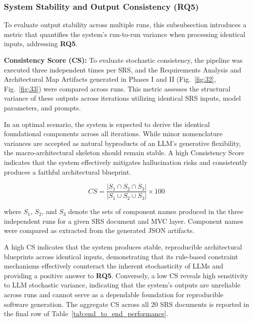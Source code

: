 \subsubsection{System Stability and Output Consistency (RQ5)}

To evaluate output stability across multiple runs, this subsubsection introduces a metric that quantifies the system's run-to-run variance when processing identical inputs, addressing \textbf{RQ5}.

\textbf{Consistency Score (CS):} To evaluate stochastic consistency, the pipeline was executed three independent times per SRS, and the Requirements Analysis and Architectural Map Artifacts generated in Phases I and II (Fig.~\ref{fig:32}, Fig.~\ref{fig:33}) were compared across runs. This metric assesses the structural variance of these outputs across iterations utilizing identical SRS inputs, model parameters, and prompts. 

In an optimal scenario, the system is expected to derive the identical foundational components across all iterations. While minor nomenclature variances are accepted as natural byproducts of an LLM's generative flexibility, the macro-architectural skeleton should remain stable. A high Consistency Score indicates that the system effectively mitigates hallucination risks and consistently produces a faithful architectural blueprint.

\begin{equation} \label{eq:cs}
CS = \frac{|S_1 \cap S_2 \cap S_3|}{|S_1 \cup S_2 \cup S_3|} \times 100
\end{equation}

where $S_1$, $S_2$, and $S_3$ denote the sets of component names produced in the three independent runs for a given SRS document and MVC layer. Component names were compared as extracted from the generated JSON artifacts.

A high CS indicates that the system produces stable, reproducible architectural blueprints across identical inputs, demonstrating that its rule-based constraint mechanisms effectively counteract the inherent stochasticity of LLMs and providing a positive answer to \textbf{RQ5}. Conversely, a low CS reveals high sensitivity to LLM stochastic variance, indicating that the system's outputs are unreliable across runs and cannot serve as a dependable foundation for reproducible software generation. The aggregate CS across all 20 SRS documents is reported in the final row of Table~\ref{tab:end_to_end_performance}.

